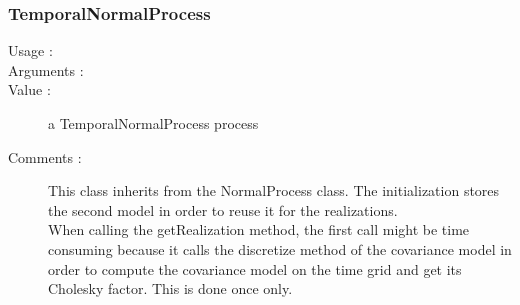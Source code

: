 \newpage \subsubsection{TemporalNormalProcess}
\begin{description}

\item[Usage :] \rule{0pt}{1em}
  \bigskip

\item[Arguments :]  \rule{0pt}{1em}
  \bigskip

\item[Value :] a TemporalNormalProcess process
  \rule{0pt}{1em}
  \bigskip

\item[Comments :] 
\rule{0pt}{1em}
This class inherits from the NormalProcess class. The initialization stores the second model in order to reuse it for the realizations. \\
When calling the getRealization method, the first call might be time consuming because it calls the discretize method of the covariance model  in order to compute the covariance model on the time grid and get its Cholesky factor. This is done once only.

\end{description}



